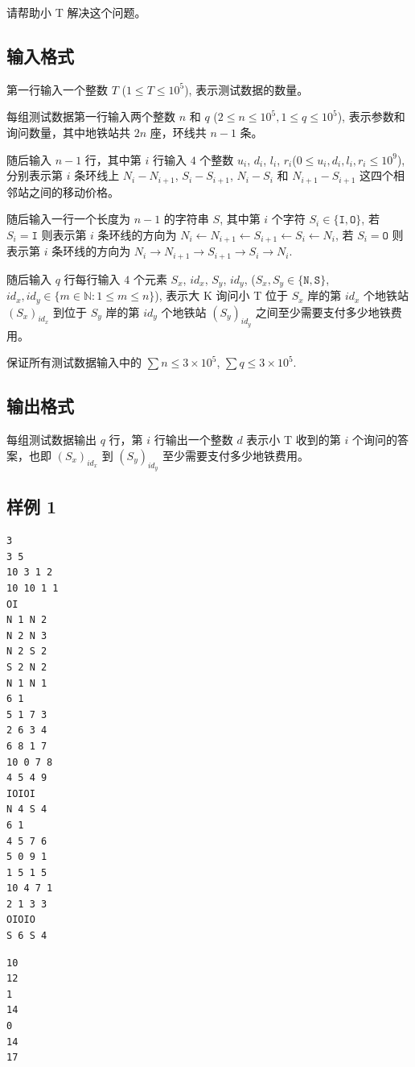 请帮助小 T 解决这个问题。

\subsection{输入格式}

第一行输入一个整数 $T$ ($ 1 \le T \le 10^5$), 表示测试数据的数量。

每组测试数据第一行输入两个整数 $n$ 和 $q$ ($2 \le n \le 10^5, 1 \le q \le 10^5$), 表示参数和询问数量，其中地铁站共 $2n$ 座，环线共 $n - 1$ 条。

随后输入 $n - 1$ 行，其中第 $i$ 行输入 $4$ 个整数 $u_i$, $d_i$, $l_i$, $r_i$($0 \le u_i, d_i, l_i, r_i \le 10^9$), 分别表示第 $i$ 条环线上 $N_i - N_{i + 1}$, $S_i - S_{i + 1}$, $N_i - S_i$ 和 $N_{i + 1} - S_{i + 1}$ 这四个相邻站之间的移动价格。

随后输入一行一个长度为 $n - 1$ 的字符串 $S$, 其中第 $i$ 个字符 $S_i \in \{\mathtt{I}, \mathtt{O}\}$, 若 $S_i = \mathtt{I}$ 则表示第 $i$ 条环线的方向为 $N_i \leftarrow N_{i + 1} \leftarrow S_{i + 1} \leftarrow S_i \leftarrow N_i$, 若 $S_i = \mathtt{O}$ 则表示第 $i$ 条环线的方向为 $N_i \rightarrow N_{i + 1} \rightarrow S_{i + 1} \rightarrow S_i \rightarrow N_i$.

随后输入 $q$ 行每行输入 $4$ 个元素 $S_x$, $id_x$, $S_y$, $id_y$, ($S_x, S_y \in \{\mathtt{N}, \mathtt{S}\}$, $id_x, id_y \in \{m \in \mathbb{N} : 1 \le m \le n\}$), 表示大 K 询问小 T 位于 $S_x$ 岸的第 $id_x$ 个地铁站 $(S_x)_{id_x}$ 到位于 $S_y$ 岸的第 $id_y$ 个地铁站 $(S_y)_{id_y}$ 之间至少需要支付多少地铁费用。

保证所有测试数据输入中的 $\sum n \le 3 \times 10^5$, $\sum q \le 3 \times 10^5$.

\subsection{输出格式}

每组测试数据输出 $q$ 行，第 $i$ 行输出一个整数 $d$ 表示小 T 收到的第 $i$ 个询问的答案，也即 $(S_x)_{id_x}$ 到 $(S_y)_{id_y}$ 至少需要支付多少地铁费用。


\subsection{样例 1}

\begin{minipage}{\linewidth}
	\begin{minipage}[t]{0.49\linewidth}
		\begin{lstlisting}[title=\texttt{standard input}]
3
3 5
10 3 1 2
10 10 1 1
OI
N 1 N 2
N 2 N 3
N 2 S 2
S 2 N 2
N 1 N 1
6 1
5 1 7 3
2 6 3 4
6 8 1 7
10 0 7 8
4 5 4 9
IOIOI
N 4 S 4
6 1
4 5 7 6
5 0 9 1
1 5 1 5
10 4 7 1
2 1 3 3
OIOIO
S 6 S 4
\end{lstlisting}
	\end{minipage}
	\begin{minipage}[t]{0.49\linewidth}
		\begin{lstlisting}[title=\texttt{standard output}]
10
12
1
14
0
14
17
\end{lstlisting}
	\end{minipage}
\end{minipage}


